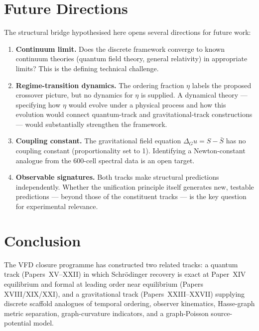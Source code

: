 \documentclass[12pt]{article}
\begin{document}
\section{Future Directions}\label{sec:future}

The structural bridge hypothesised here opens several directions for future work:

\begin{enumerate}
    \item \textbf{Continuum limit.} Does the discrete framework converge to known continuum theories (quantum field theory, general relativity) in appropriate limits? This is the defining technical challenge.

    \item \textbf{Regime-transition dynamics.} The ordering fraction $\eta$ labels the proposed crossover picture, but no dynamics for $\eta$ is supplied. A dynamical theory --- specifying how $\eta$ would evolve under a physical process and how this evolution would connect quantum-track and gravitational-track constructions --- would substantially strengthen the framework.

    \item \textbf{Coupling constant.} The gravitational field equation $\Delta_G u = S - \bar{S}$ has no coupling constant (proportionality set to 1). Identifying a Newton-constant analogue from the 600-cell spectral data is an open target.

    \item \textbf{Observable signatures.} Both tracks make structural predictions independently. Whether the unification principle itself generates new, testable predictions --- beyond those of the constituent tracks --- is the key question for experimental relevance.
\end{enumerate}

\section{Conclusion}\label{sec:conclusion}

The VFD closure programme has constructed two related tracks: a quantum track (Papers~XV--XXII) in which Schr\"odinger recovery is exact at Paper~XIV equilibrium and formal at leading order near equilibrium (Papers XVIII/XIX/XXI), and a gravitational track (Papers~XXIII--XXVII) supplying discrete scaffold analogues of temporal ordering, observer kinematics, Hasse-graph metric separation, graph-curvature indicators, and a graph-Poisson source-potential model.
\end{document}
